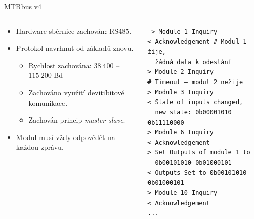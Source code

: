 \documentclass[aspectratio=169]{beamer}
\begin{document}
\begin{frame}{MTBbus v4}
\begin{columns}
	\begin{column}{.5\textwidth}
		\begin{itemize}
		\item Hardware sběrnice zachován: RS485.
		\item Protokol navrhnut od základů znovu.
		\begin{itemize}
			\item Rychlost zachována: $38\ 400$ – $115\ 200$ Bd
			\item Zachováno využití devitibitové komunikace.
			\item Zachován princip \textit{master-slave}.
		\end{itemize}
		\item Modul musí vždy odpovědět na každou zprávu.
		\end{itemize}
	\end{column}
	\pause
	\begin{column}{.5\textwidth}\texttt{\footnotesize
> Module 1 Inquiry \\
< Acknowledgement  \# Modul 1 žije, \\
  žádná data k odeslání \\
> Module 2 Inquiry \\
\# Timeout – modul 2 nežije \\
> Module 3 Inquiry \\
< State of inputs changed, \\
  new state: 0b00001010 0b11110000 \\
> Module 6 Inquiry \\
< Acknowledgement \\
> Set Outputs of module 1 to\\
  0b00101010 0b01000101 \\
< Outputs Set to 0b00101010 0b01000101 \\
> Module 10 Inquiry \\
< Acknowledgement \\
...}
	\end{column}
\end{columns}
\end{frame}

\end{document}
